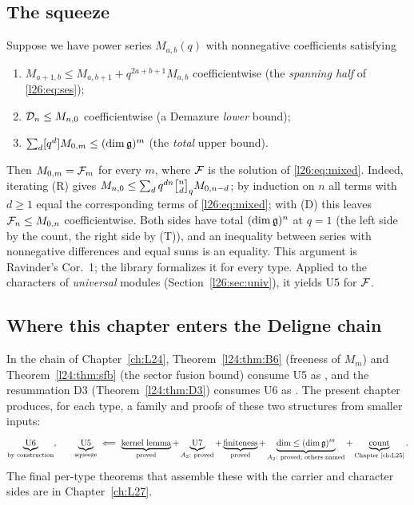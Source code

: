 \subsection{The squeeze}\label{l26:sec:squeeze-paper}

Suppose we have power series $M_{a,b}(q)$ with nonnegative coefficients satisfying
\begin{enumerate}
\item[(R)] $M_{a+1,b}\le M_{a,b+1}+q^{2a+b+1}M_{a,b}$ coefficientwise (the \emph{spanning half} of \eqref{l26:eq:ses});
\item[(D)] $\mathcal D_n\le M_{n,0}$ coefficientwise (a Demazure \emph{lower} bound);
\item[(T)] $\sum_d[q^d]M_{0,m}\le(\dim\mathfrak g)^m$ (the \emph{total} upper bound).
\end{enumerate}
Then $M_{0,m}=\mathcal F_m$ for every $m$, where $\mathcal F$ is the solution of \eqref{l26:eq:mixed}. Indeed,
iterating (R) gives $M_{n,0}\le\sum_dq^{dn}\ltwentysixqb nd M_{0,n-d}$; by induction on $n$ all terms with $d\ge1$ equal
the corresponding terms of \eqref{l26:eq:mixed}; with (D) this leaves $\mathcal F_n\le M_{0,n}$ coefficientwise.
Both sides have total $(\dim\mathfrak g)^n$ at $q=1$ (the left side by the count, the right side by (T)), and an
inequality between series with nonnegative differences and equal sums is an equality. This argument is Ravinder's
Cor.~1; the library formalizes it for every type. Applied to the characters of \emph{universal} modules
(Section~\ref{l26:sec:univ}), it yields U5 for $\mathcal F$.

\subsection{Where this chapter enters the Deligne chain}

In the chain of Chapter~\ref{ch:L24}, Theorem~\ref{l24:thm:B6} (freeness of $M_m$) and Theorem~\ref{l24:thm:sfb} (the
sector fusion bound) consume U5 as , and the resummation D3
(Theorem~\ref{l24:thm:D3}) consumes U6 as . The present chapter produces, for each
type, a family  and proofs of these two structures from smaller inputs:
\begin{equation*}
\underbrace{\text{U6}}_{\text{by construction}},\qquad
\underbrace{\text{U5}}_{\text{squeeze}}\ \Longleftarrow\ \underbrace{\text{kernel lemma}}_{\text{proved}}
+\underbrace{\text{U7}}_{A_2:\ \text{proved}}+\underbrace{\text{finiteness}}_{\text{proved}}
+\underbrace{\dim\le(\dim\ltwentysixg)^m}_{A_2:\ \text{proved; others named}}+\underbrace{\text{count}}_{\text{Chapter~\ref{ch:L25}}} .
\end{equation*}
The final per-type theorems that assemble these with the carrier and character sides are in Chapter~\ref{ch:L27}.

